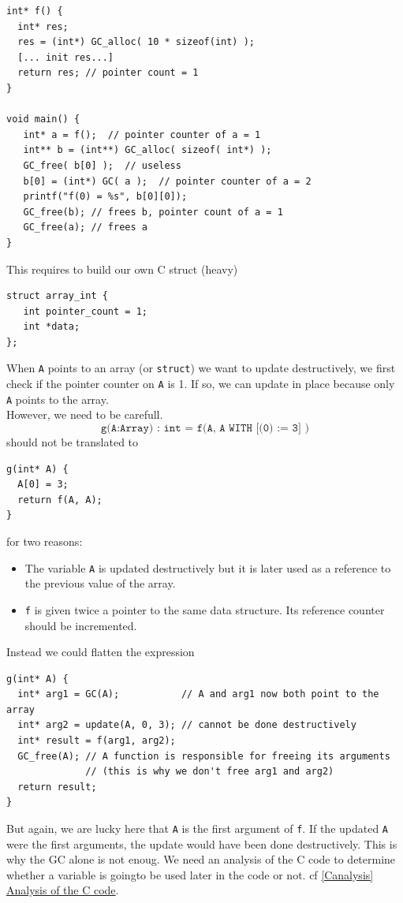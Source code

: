 \documentclass[12pt,a4paper,titlepage]{article}
\newcommand{\cl}[1]{\texttt{#1}}
\begin{document}
\begin{lstlisting}
int* f() {
  int* res;
  res = (int*) GC_alloc( 10 * sizeof(int) );
  [... init res...]
  return res; // pointer count = 1
}

void main() {
   int* a = f();  // pointer counter of a = 1
   int** b = (int**) GC_alloc( sizeof( int*) );
   GC_free( b[0] );  // useless
   b[0] = (int*) GC( a );  // pointer counter of a = 2
   printf("f(0) = %s", b[0][0]);
   GC_free(b); // frees b, pointer count of a = 1
   GC_free(a); // frees a
}
\end{lstlisting}

This requires to build our own C struct (heavy)
\begin{lstlisting}
struct array_int {
   int pointer_count = 1;
   int *data;
};
\end{lstlisting}

When \cl{A} points to an array (or \cl{struct}) we want to update destructively, we first check if the pointer counter on \cl{A} is 1. If so, we can update in place because only \cl{A} points to the array.\\

However, we need to be carefull.
$$ \cl{g(A:Array) : int = f(A, A WITH [(0) := 3] )}$$
should not be translated to
\begin{lstlisting}
g(int* A) {
  A[0] = 3;
  return f(A, A);
}
\end{lstlisting}
for two reasons:
\begin{itemize}
\item The variable \cl{A} is updated destructively but it is later used as a reference to the previous value of the array.
\item \cl{f} is given twice a pointer to the same data structure. Its reference counter should be incremented.
\end{itemize}


Instead we could flatten the expression
\begin{lstlisting}
g(int* A) {
  int* arg1 = GC(A);           // A and arg1 now both point to the array
  int* arg2 = update(A, 0, 3); // cannot be done destructively
  int* result = f(arg1, arg2);
  GC_free(A); // A function is responsible for freeing its arguments
              // (this is why we don't free arg1 and arg2)
  return result;
}
\end{lstlisting}
But again, we are lucky here that \cl{A} is the first argument of \cl{f}. If the updated \cl{A} were the first arguments, the update would have been done destructively.
This is why the GC alone is not enoug. We need an analysis of the C code to determine whether a variable is goingto be used later in the code or not. cf \hyperref[Canalysis]{\ref*{Canalysis} Analysis of the C code}.
\end{document}
